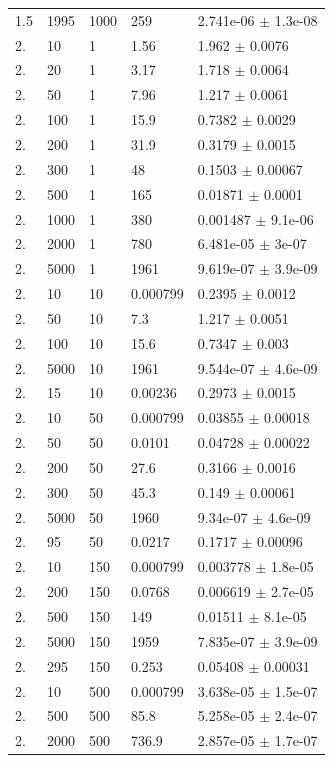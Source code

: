 \begin{longtable}{lllll}
	1.5 & 1995 & 1000 & 259 & 2.741e-06 $\pm$ 1.3e-08 \\
	2. & 10 & 1 & 1.56 & 1.962 $\pm$ 0.0076 \\
	2. & 20 & 1 & 3.17 & 1.718 $\pm$ 0.0064 \\
	2. & 50 & 1 & 7.96 & 1.217 $\pm$ 0.0061 \\
	2. & 100 & 1 & 15.9 & 0.7382 $\pm$ 0.0029 \\
	2. & 200 & 1 & 31.9 & 0.3179 $\pm$ 0.0015 \\
	2. & 300 & 1 & 48 & 0.1503 $\pm$ 0.00067 \\
	2. & 500 & 1 & 165 & 0.01871 $\pm$ 0.0001 \\
	2. & 1000 & 1 & 380 & 0.001487 $\pm$ 9.1e-06 \\
	2. & 2000 & 1 & 780 & 6.481e-05 $\pm$ 3e-07 \\
	2. & 5000 & 1 & 1961 & 9.619e-07 $\pm$ 3.9e-09 \\
	2. & 10 & 10 & 0.000799 & 0.2395 $\pm$ 0.0012 \\
	2. & 50 & 10 & 7.3 & 1.217 $\pm$ 0.0051 \\
	2. & 100 & 10 & 15.6 & 0.7347 $\pm$ 0.003 \\
	2. & 5000 & 10 & 1961 & 9.544e-07 $\pm$ 4.6e-09 \\
	2. & 15 & 10 & 0.00236 & 0.2973 $\pm$ 0.0015 \\
	2. & 10 & 50 & 0.000799 & 0.03855 $\pm$ 0.00018 \\
	2. & 50 & 50 & 0.0101 & 0.04728 $\pm$ 0.00022 \\
	2. & 200 & 50 & 27.6 & 0.3166 $\pm$ 0.0016 \\
	2. & 300 & 50 & 45.3 & 0.149 $\pm$ 0.00061 \\
	2. & 5000 & 50 & 1960 & 9.34e-07 $\pm$ 4.6e-09 \\
	2. & 95 & 50 & 0.0217 & 0.1717 $\pm$ 0.00096 \\
	2. & 10 & 150 & 0.000799 & 0.003778 $\pm$ 1.8e-05 \\
	2. & 200 & 150 & 0.0768 & 0.006619 $\pm$ 2.7e-05 \\
	2. & 500 & 150 & 149 & 0.01511 $\pm$ 8.1e-05 \\
	2. & 5000 & 150 & 1959 & 7.835e-07 $\pm$ 3.9e-09 \\
	2. & 295 & 150 & 0.253 & 0.05408 $\pm$ 0.00031 \\
	2. & 10 & 500 & 0.000799 & 3.638e-05 $\pm$ 1.5e-07 \\
	2. & 500 & 500 & 85.8 & 5.258e-05 $\pm$ 2.4e-07 \\
	2. & 2000 & 500 & 736.9 & 2.857e-05 $\pm$ 1.7e-07 \\

\end{longtable}

